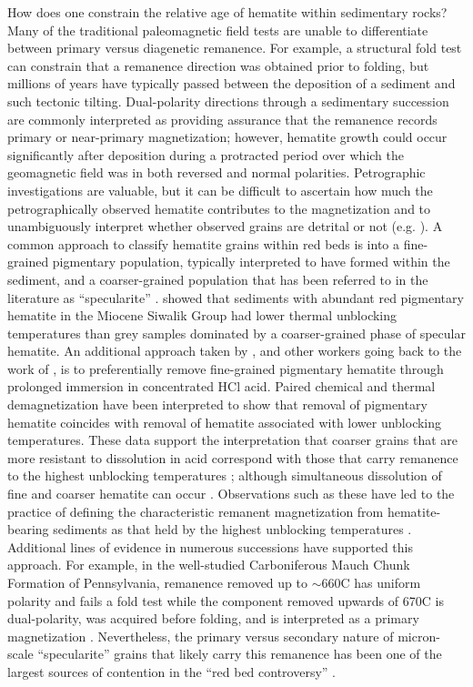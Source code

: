 \documentclass[draft]{agujournal2019}
\begin{document}
How does one constrain the relative age of hematite within sedimentary rocks? Many of the traditional paleomagnetic field tests are unable to differentiate between primary versus diagenetic remanence. For example, a structural fold test can constrain that a remanence direction was obtained prior to folding, but millions of years have typically passed between the deposition of a sediment and such tectonic tilting. Dual-polarity directions through a sedimentary succession are commonly interpreted as providing assurance that the remanence records primary or near-primary magnetization; however, hematite growth could occur significantly after deposition during a protracted period over which the geomagnetic field was in both reversed and normal polarities. Petrographic investigations are valuable, but it can be difficult to ascertain how much the petrographically observed hematite contributes to the magnetization and to unambiguously interpret whether observed grains are detrital or not (e.g. \cite{Elmore1982a}). A common approach to classify hematite grains within red beds is into a fine-grained pigmentary population, typically interpreted to have formed within the sediment, and a coarser-grained population that has been referred to in the literature as ``specularite'' \cite{Butler1992a, Van-Der-Voo2012a}.  showed that sediments with abundant red pigmentary hematite in the Miocene Siwalik Group had lower thermal unblocking temperatures than grey samples dominated by a coarser-grained phase of specular hematite. An additional approach taken by , and other workers going back to the work of , is to preferentially remove fine-grained pigmentary hematite through prolonged immersion in concentrated HCl acid. Paired chemical and thermal demagnetization have been interpreted to show that removal of pigmentary hematite coincides with removal of hematite associated with lower unblocking temperatures. These data support the interpretation that coarser grains that are more resistant to dissolution in acid correspond with those that carry remanence to the highest unblocking temperatures \cite{Tauxe1980a,Bilardello2010c}; although simultaneous dissolution of fine and coarser hematite can occur \cite{Jiang2017a}. Observations such as these have led to the practice of defining the characteristic remanent magnetization from hematite-bearing sediments as that held by the highest unblocking temperatures \cite{Van-Der-Voo2012a}. Additional lines of evidence in numerous successions have supported this approach. For example, in the well-studied Carboniferous Mauch Chunk Formation of Pennsylvania, remanence removed up to $\sim$660\textdegree C has uniform polarity and fails a fold test while the component removed upwards of 670\textdegree C is dual-polarity, was acquired before folding, and is interpreted as a primary magnetization \cite{Kent1985b, DiVenere1991a}. Nevertheless, the primary versus secondary nature of micron-scale ``specularite'' grains that likely carry this remanence has been one of the largest sources of contention in the ``red bed controversy'' \cite{Van-Houten1968a, Tauxe1980a, Butler1992a, Van-Der-Voo2012a}.
\end{document}
